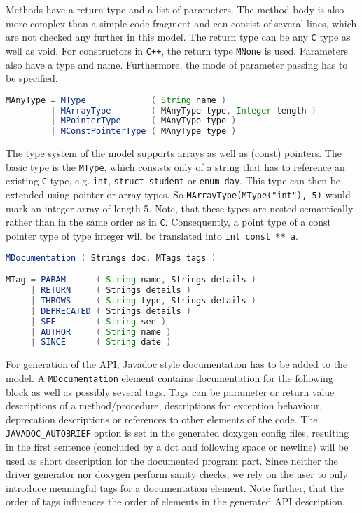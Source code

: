 \documentclass{report}
\begin{document}
Methods have a return type and a list of parameters. The method body is also more complex than a simple code fragment and can consist of several lines, which are not checked any further in this model. The return type can be any \texttt{C} type as well as void. For constructors in \texttt{C++}, the return type \texttt{MNone} is used. Parameters also have a type and name. Furthermore, the mode of parameter passing has to be specified.

\begin{lstlisting}[language=java, breaklines=true]
MAnyType = MType             ( String name )
         | MArrayType        ( MAnyType type, Integer length )
         | MPointerType      ( MAnyType type )
         | MConstPointerType ( MAnyType type )
\end{lstlisting}

The type system of the model supports arrays as well as (const) pointers. The basic type is the \texttt{MType}, which consists only of a string that has to reference an existing \texttt{C} type, e.g. \texttt{int}, \texttt{struct student} or \texttt{enum day}. This type can then be extended using pointer or array types. So \texttt{MArrayType(MType("int"), 5)} would mark an integer array of length 5. Note, that these types are nested semantically rather than in the same order as in \texttt{C}. Consequently, a point type of a const pointer type of type integer will be translated into \texttt{int const ** a}.

\begin{lstlisting}[language=java, breaklines=true]
MDocumentation ( Strings doc, MTags tags )

MTag = PARAM      ( String name, Strings details )
     | RETURN     ( Strings details )
     | THROWS     ( String type, Strings details )
     | DEPRECATED ( Strings details ) 
     | SEE        ( String see )
     | AUTHOR     ( String name )
     | SINCE      ( String date )
\end{lstlisting}

For generation of the API, Javadoc style documentation has to be added to the model. A \texttt{MDocumentation} element contains documentation for the following block as well as possibly several tags. Tags can be parameter or return value descriptions of a method/procedure, descriptions for exception behaviour, deprecation descriptions or references to other elements of the code. The \texttt{JAVADOC\_AUTOBRIEF} option is set in the generated doxygen config files, resulting in the first sentence (concluded by a dot and following space or newline) will be used as short description for the documented program part. Since neither the driver generator nor doxygen perform sanity checks, we rely on the user to only introduce meaningful tags for a documentation element. Note further, that the order of tags influences the order of elements in the generated API description.
\end{document}
